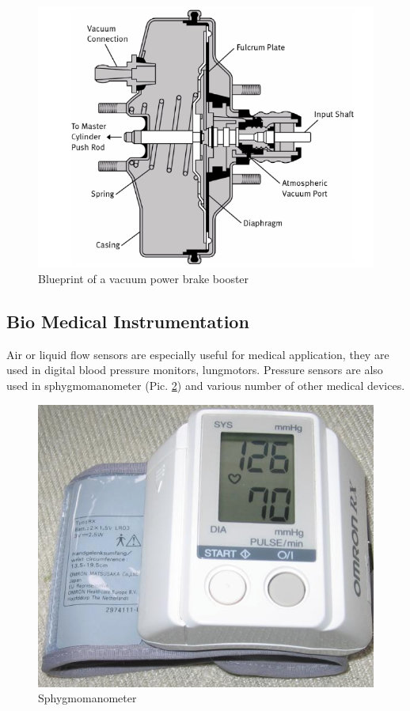 \documentclass[english]{article}
\begin{document}
\begin{figure}
\centerline{\includegraphics[scale=0.5]{PressureSensors/break}}
\caption{Blueprint of a vacuum power brake booster\label{fig:break} \cite{inf}}
\end{figure}

\subsection{Bio Medical Instrumentation}

Air or liquid flow sensors are especially useful for medical application, they are used in digital blood pressure monitors, lungmotors. Pressure sensors are also used in sphygmomanometer (Pic. \ref{fig:ton}) and various number of other medical devices. \cite{app}

\begin{figure}
\centerline{\includegraphics[scale=0.3]{PressureSensors/ton}}
\caption{Sphygmomanometer\label{fig:ton} \cite{ton}}
\end{figure}
\end{document}
